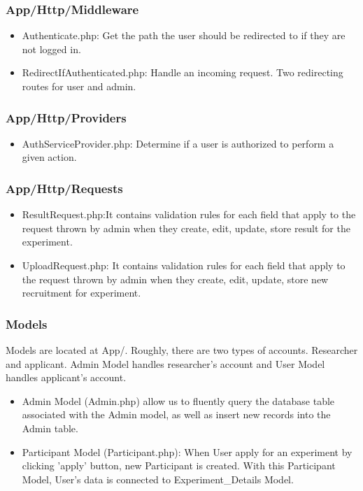 \documentclass[letterpaper, 10 pt, conference]{ieeeconf}  %
\begin{document}
\subsubsection{App/Http/Middleware\\}
\begin{itemize}
    \item Authenticate.php: Get the path the user should be redirected to if they are not logged in.
    \item RedirectIfAuthenticated.php: Handle an incoming request. Two redirecting routes for user and admin.\\
\end{itemize}
\subsubsection{App/Http/Providers\\}
\begin{itemize}
    \item AuthServiceProvider.php: Determine if a user is authorized to perform a given action.\\
\end{itemize}
\subsubsection{App/Http/Requests\\}
\begin{itemize}
    \item ResultRequest.php:It contains validation rules for each field that apply to the request thrown by admin when they create, edit, update, store result for the experiment.
    \item UploadRequest.php: It contains validation rules for each field that apply to the request thrown by admin when they create, edit, update, store new recruitment for experiment.\\
\end{itemize}
\subsubsection{Models}
Models are located at App/. Roughly, there are two types of accounts. Researcher and applicant. Admin Model handles researcher's account and User Model handles applicant's account. 
\begin{itemize}
    \item Admin Model (Admin.php) allow us to fluently query the database table associated with the Admin model, as well as insert new records into the Admin table.
    \item Participant Model (Participant.php): When User apply for an experiment by clicking 'apply' button, new Participant is created. With this Participant Model, User's data is connected to Experiment\_Details Model. 
\end{itemize}
\end{document}
